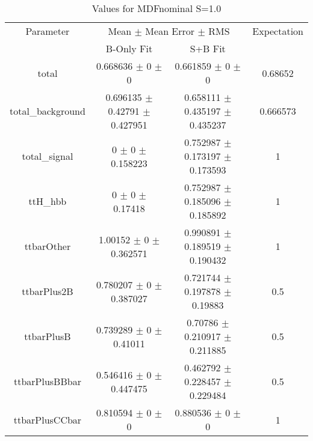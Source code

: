 \begin{table}
\centering
\caption{Values for MDFnominal S=1.0}
\begin{tabular}{cccc}
\toprule
Parameter & \multicolumn{2}{c}{Mean $\pm$ Mean Error $\pm$ RMS} & Expectation\\
 & B-Only Fit & S+B Fit & \\
\midrule
total & \num{0.668636} $\pm$ \num{0} $\pm$ \num{0} & \num{0.661859} $\pm$ \num{0} $\pm$ \num{0} & \num{0.68652}\\
total\_background & \num{0.696135} $\pm$ \num{0.42791} $\pm$ \num{0.427951} & \num{0.658111} $\pm$ \num{0.435197} $\pm$ \num{0.435237} & \num{0.666573}\\
total\_signal & \num{0} $\pm$ \num{0} $\pm$ \num{0.158223} & \num{0.752987} $\pm$ \num{0.173197} $\pm$ \num{0.173593} & \num{1}\\
ttH\_hbb & \num{0} $\pm$ \num{0} $\pm$ \num{0.17418} & \num{0.752987} $\pm$ \num{0.185096} $\pm$ \num{0.185892} & \num{1}\\
ttbarOther & \num{1.00152} $\pm$ \num{0} $\pm$ \num{0.362571} & \num{0.990891} $\pm$ \num{0.189519} $\pm$ \num{0.190432} & \num{1}\\
ttbarPlus2B & \num{0.780207} $\pm$ \num{0} $\pm$ \num{0.387027} & \num{0.721744} $\pm$ \num{0.197878} $\pm$ \num{0.19883} & \num{0.5}\\
ttbarPlusB & \num{0.739289} $\pm$ \num{0} $\pm$ \num{0.41011} & \num{0.70786} $\pm$ \num{0.210917} $\pm$ \num{0.211885} & \num{0.5}\\
ttbarPlusBBbar & \num{0.546416} $\pm$ \num{0} $\pm$ \num{0.447475} & \num{0.462792} $\pm$ \num{0.228457} $\pm$ \num{0.229484} & \num{0.5}\\
ttbarPlusCCbar & \num{0.810594} $\pm$ \num{0} $\pm$ \num{0} & \num{0.880536} $\pm$ \num{0} $\pm$ \num{0} & \num{1}\\
\bottomrule
\end{tabular}
\end{table}